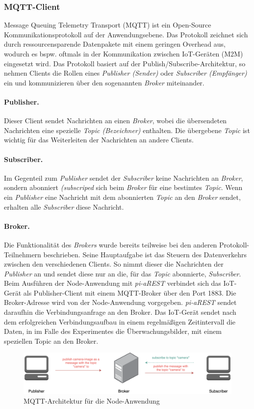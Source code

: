 \subsubsection{MQTT-Client}
Message Queuing Telemetry Transport (MQTT) ist ein Open-Source Kommunikationsprotokoll auf der
Anwendungsebene. Das Protokoll zeichnet sich durch ressourcensparende Datenpakete mit einem 
geringen Overhead aus, wodurch es bspw. oftmals in der Kommunikation zwischen IoT-Geräten (M2M) 
eingesetzt wird. Das Protokoll basiert auf der Publish/Subscribe-Architektur, so nehmen Clients
die Rollen eines \textit{Publisher (Sender)} oder \textit{Subscriber (Empfänger)} ein und kommunizieren
über den sogenannten \textit{Broker} miteinander.

\paragraph{Publisher.} 
Dieser Client sendet Nachrichten an einen \textit{Broker}, wobei die übersendeten Nachrichten eine spezielle
\textit{Topic (Bezeichner)} enthalten. Die übergebene \textit{Topic} ist wichtig für das Weiterleiten der
Nachrichten an andere Clients.


\paragraph{Subscriber.} 
Im Gegenteil zum \textit{Publisher} sendet der \textit{Subscriber} keine Nachrichten an \textit{Broker},
sondern abonniert \textit{(subscriped} sich beim \textit{Broker} für eine bestimtes \textit{Topic}. 
Wenn ein \textit{Publisher} eine Nachricht mit dem abonnierten \textit{Topic} an den \textit{Broker}
sendet, erhalten alle \textit{Subscriber} diese Nachricht.


\paragraph{Broker.} 
Die Funktionalität des \textit{Brokers} wurde bereits teilweise bei den anderen Protokoll-Teilnehmern 
beschrieben. Seine Hauptaufgabe ist das Steuern des Datenverkehrs zwischen den verschiedenen Clients.
So nimmt dieser die Nachrichten der \textit{Publisher} an und sendet diese nur an die, für das \textit{Topic} 
abonnierte, \textit{Subscriber}.  \\


Beim Ausführen der Node-Anwendung mit \textit{pi-aREST} verbindet sich das IoT-Gerät als Publisher-Client
mit einem MQTT-Broker über den Port 1883. Die Broker-Adresse wird von der Node-Anwendung vorgegeben.
\textit{pi-aREST} sendet daraufhin die Verbindungsanfrage an den Broker. Das IoT-Gerät sendet nach dem 
erfolgreichen Verbindungsaufbau in einem regelmäßigen Zeitintervall die Daten, in im Falle des Experimentes
die Überwachungsbilder, mit einem speziellen Topic an den Broker. \\

\begin{figure}[h]
  \centering
  \includegraphics[width=145mm]{images/mqtt.png}
  \caption{MQTT-Architektur für die Node-Anwendung}
  \label{fig:arch-mqtt}
\end{figure}

